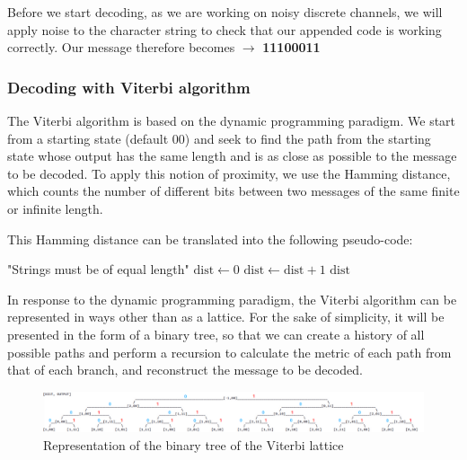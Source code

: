 Before we start decoding, as we are working on noisy discrete channels, we will apply noise to the character string to check that our appended code is working correctly. Our message therefore becomes $\rightarrow$ \textbf{11100011}


\subsubsection{Decoding with Viterbi algorithm}

The Viterbi algorithm is based on the dynamic programming paradigm. We start from a starting state (default 00) and seek to find the path from the starting state whose output has the same length and is as close as possible to the message to be decoded. To apply this notion of proximity, we use the Hamming distance, which counts the number of different bits between two messages of the same finite or infinite length. 

This Hamming distance can be translated into the following pseudo-code:

\begin{algorithm}[H]
\begin{algorithmic}
        \State \Return "Strings must be of equal length"
    \EndIf
    \State $\text{dist} \gets 0$
            \State $\text{dist} \gets \text{dist} + 1$
        \EndIf
    \EndFor
    \State \Return $\text{dist}$
\EndFunction
\end{algorithmic}
\end{algorithm}

In response to the dynamic programming paradigm, the Viterbi algorithm can be represented in ways other than as a lattice. For the sake of simplicity, it will be presented in the form of a binary tree, so that we can create a history of all possible paths and perform a recursion to calculate the metric of each path from that of each branch, and reconstruct the message to be decoded.

\begin{figure}[H]
     \centering
     \includegraphics[width=1\linewidth]{images/BT_ECC_CV.png}
     \caption{Representation of the binary tree of the Viterbi lattice}
     \label{fig:bt-ecc-cv}
\end{figure}

